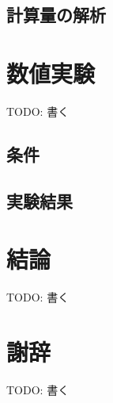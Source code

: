 \documentclass[a4paper,11pt]{jreport}
\begin{document}
\section{計算量の解析}


\chapter{数値実験}

TODO: 書く
\section{条件}
\section{実験結果}

\chapter{結論}

TODO: 書く

\chapter*{謝辞}

TODO: 書く

\newpage

\renewcommand{\bibname}{参考文献}
\end{document}
